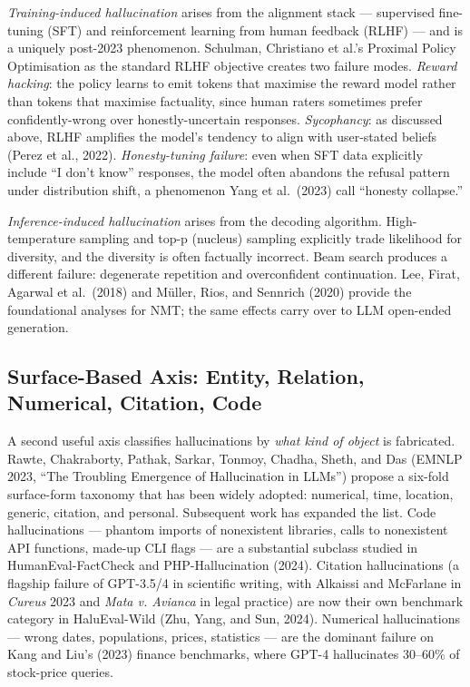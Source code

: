 \emph{Training-induced hallucination} arises from the alignment stack --- supervised fine-tuning (SFT) and reinforcement learning from human feedback (RLHF) --- and is a uniquely post-2023 phenomenon. Schulman, Christiano et al.'s Proximal Policy Optimisation as the standard RLHF objective creates two failure modes. \emph{Reward hacking}: the policy learns to emit tokens that maximise the reward model rather than tokens that maximise factuality, since human raters sometimes prefer confidently-wrong over honestly-uncertain responses. \emph{Sycophancy}: as discussed above, RLHF amplifies the model's tendency to align with user-stated beliefs (Perez et al., 2022). \emph{Honesty-tuning failure}: even when SFT data explicitly include ``I don't know'' responses, the model often abandons the refusal pattern under distribution shift, a phenomenon Yang et al.~(2023) call ``honesty collapse.''

\emph{Inference-induced hallucination} arises from the decoding algorithm. High-temperature sampling and top-p (nucleus) sampling explicitly trade likelihood for diversity, and the diversity is often factually incorrect. Beam search produces a different failure: degenerate repetition and overconfident continuation. Lee, Firat, Agarwal et al.~(2018) and Müller, Rios, and Sennrich (2020) provide the foundational analyses for NMT; the same effects carry over to LLM open-ended generation.

\subsection{Surface-Based Axis: Entity, Relation, Numerical, Citation, Code}\label{surface-based-axis-entity-relation-numerical-citation-code}

A second useful axis classifies hallucinations by \emph{what kind of object} is fabricated. Rawte, Chakraborty, Pathak, Sarkar, Tonmoy, Chadha, Sheth, and Das (EMNLP 2023, ``The Troubling Emergence of Hallucination in LLMs'') propose a six-fold surface-form taxonomy that has been widely adopted: numerical, time, location, generic, citation, and personal. Subsequent work has expanded the list. Code hallucinations --- phantom imports of nonexistent libraries, calls to nonexistent API functions, made-up CLI flags --- are a substantial subclass studied in HumanEval-FactCheck and PHP-Hallucination (2024). Citation hallucinations (a flagship failure of GPT-3.5/4 in scientific writing, with Alkaissi and McFarlane in \emph{Cureus} 2023 and \emph{Mata v. Avianca} in legal practice) are now their own benchmark category in HaluEval-Wild (Zhu, Yang, and Sun, 2024). Numerical hallucinations --- wrong dates, populations, prices, statistics --- are the dominant failure on Kang and Liu's (2023) finance benchmarks, where GPT-4 hallucinates 30--60\% of stock-price queries.

